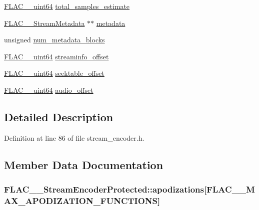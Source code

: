 \begin{DoxyCompactItemize}
\item 
\hyperlink{ordinals_8h_aa78c8c70a3eb8a58af7436f278acde8e}{F\+L\+A\+C\+\_\+\+\_\+uint64} \hyperlink{struct_f_l_a_c_____stream_encoder_protected_a892d324d6fe117ad7361c3ef71698d84}{total\+\_\+samples\+\_\+estimate}
\item 
\hyperlink{struct_f_l_a_c_____stream_metadata}{F\+L\+A\+C\+\_\+\+\_\+\+Stream\+Metadata} $\ast$$\ast$ \hyperlink{struct_f_l_a_c_____stream_encoder_protected_ad296447a20c5d7aeda4de51b845d12ee}{metadata}
\item 
unsigned \hyperlink{struct_f_l_a_c_____stream_encoder_protected_aae37d8bd0ff9bf84b263523b7a00032b}{num\+\_\+metadata\+\_\+blocks}
\item 
\hyperlink{ordinals_8h_aa78c8c70a3eb8a58af7436f278acde8e}{F\+L\+A\+C\+\_\+\+\_\+uint64} \hyperlink{struct_f_l_a_c_____stream_encoder_protected_a247ffee7f79cdbf44c24b498e4828386}{streaminfo\+\_\+offset}
\item 
\hyperlink{ordinals_8h_aa78c8c70a3eb8a58af7436f278acde8e}{F\+L\+A\+C\+\_\+\+\_\+uint64} \hyperlink{struct_f_l_a_c_____stream_encoder_protected_aafbb71f041c3ced3f8031440f2fad60d}{seektable\+\_\+offset}
\item 
\hyperlink{ordinals_8h_aa78c8c70a3eb8a58af7436f278acde8e}{F\+L\+A\+C\+\_\+\+\_\+uint64} \hyperlink{struct_f_l_a_c_____stream_encoder_protected_a306d71678065f5aceeef636bb1edca6c}{audio\+\_\+offset}
\end{DoxyCompactItemize}


\subsection{Detailed Description}


Definition at line 86 of file stream\+\_\+encoder.\+h.



\subsection{Member Data Documentation}
\subsubsection[{\texorpdfstring{apodizations}{apodizations}}]{ F\+L\+A\+C\+\_\+\+\_\+\+Stream\+Encoder\+Protected\+::apodizations\mbox{[}{\bf F\+L\+A\+C\+\_\+\+\_\+\+M\+A\+X\+\_\+\+A\+P\+O\+D\+I\+Z\+A\+T\+I\+O\+N\+\_\+\+F\+U\+N\+C\+T\+I\+O\+NS}\mbox{]}}\hypertarget{struct_f_l_a_c_____stream_encoder_protected_a6897dec9058f0cf27cf9cf9d0526be2d}{}\label{struct_f_l_a_c_____stream_encoder_protected_a6897dec9058f0cf27cf9cf9d0526be2d}


